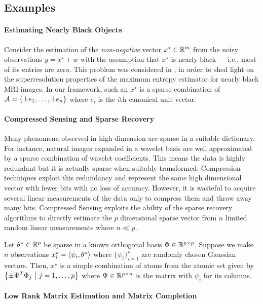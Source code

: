 \subsection{Examples}

\paragraph{Estimating Nearly Black Objects}

Consider the estimation of the \emph{non-negative} vector $x^\star \in \mathbb{R}^m$
from the noisy observations $y = x^\star + w$ with the assumption that $x^\star$
is nearly black --- i.e., most of its entries are zero. This problem was
considered in \cite{DonohoNearlyBlack92,JohnstoneSparse94}, in order to shed
light on the superresolution properties of the maximum entropy estimator for
nearly black MRI images. In our framework, such an $x^\star$ is a sparse
combination of $\mathcal{A} = \{ \pm e_1, \dots, \pm e_n\}$ where $e_i$ is the $i$th
canonical unit vector.

\paragraph{Compressed Sensing and Sparse Recovery}

Many phenomena observed in high dimension are sparse in a suitable dictionary.
For instance, natural images expanded in a wavelet basis are well approximated
by a sparse combination of wavelet coefficients. This means the data is highly
redundant but it is actually sparse when suitably transformed. Compression
techniques exploit this redundancy and represent the same high dimensional
vector with fewer bits with no loss of accuracy. However, it is wasteful to
acquire several linear measurements of the data only to compress them and throw
away many bits. Compressed Sensing exploits the ability of the sparse recovery
algorithms to directly estimate the $p$ dimensional sparse vector from $n$
limited random linear measurements where $n \ll p$.

Let $\theta^\star \in \mathbb{R}^p$ be sparse in a known orthogonal basis $\Phi \in
\mathbb{R}^{p \times p}$. Suppose we make $n$ observations $x^\star_i =
\langle\psi_i, \theta^\star\rangle$ where $\{\psi_i\}_{i=1}^n$ are randomly chosen
Gaussian vectors. Then, $x^\star$ is a simple combination of atoms from the
atomic set given by $\left\{ \pm \Psi^T \Phi_j ~\middle|~ j=1,\ldots,p \right\}$ where $\Psi \in
\mathbb{R}^{p \times n}$ is the matrix with $\psi_i$ for its columns.

\paragraph{Low Rank Matrix Estimation and Matrix Completion}

